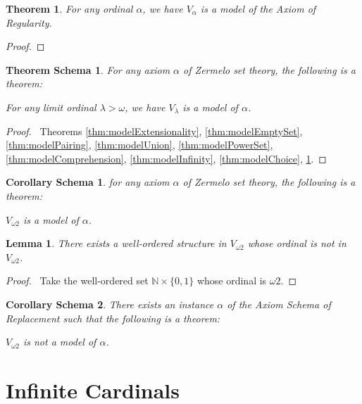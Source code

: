 \documentclass{book}
\let\qed\relax
\newtheorem{cors}{Corollary Schema}[ax]
\newtheorem{thm}[ax]{Theorem}
\newtheorem{thms}[ax]{Theorem Schema}
\newtheorem{lm}[ax]{Lemma}
\theoremstyle{definition}
\begin{document}
\begin{thm}
\label{thm:modelRegularity}
For any ordinal $\alpha$, we have $V_\alpha$ is a model of the Axiom of Regularity.
\end{thm}

\begin{proof}
\pf
{}
\qed
\end{proof}

\begin{thms}
For any axiom $\alpha$ of Zermelo set theory, the following is a theorem:

For any limit ordinal $\lambda > \omega$, we have $V_\lambda$ is a model of $\alpha$.
\end{thms}

\begin{proof}
\pf\ Theorems \ref{thm:modelExtensionality}, \ref{thm:modelEmptySet}, \ref{thm:modelPairing}, \ref{thm:modelUnion}, \ref{thm:modelPowerSet}, \ref{thm:modelComprehension}, \ref{thm:modelInfinity}, \ref{thm:modelChoice}, \ref{thm:modelRegularity}. \qed
\end{proof}

\begin{cors}
\label{cor:modelZermelo}
for any axiom $\alpha$ of Zermelo set theory, the following is a theorem:

$V_{\omega 2}$ is a model of $\alpha$.
\end{cors}

\begin{lm}
There exists a well-ordered structure in $V_{\omega 2}$ whose ordinal is not in $V_{\omega 2}$.
\end{lm}

\begin{proof}
\pf\ Take the well-ordered set $\mathbb{N} \times \{0,1\}$ whose ordinal is $\omega 2$. \qed
\end{proof}

\begin{cors}
There exists an instance $\alpha$ of the Axiom Schema of Replacement such that the following is a theorem:

$V_{\omega 2}$ is not a model of $\alpha$.
\end{cors}

\chapter{Infinite Cardinals}
\end{document}
